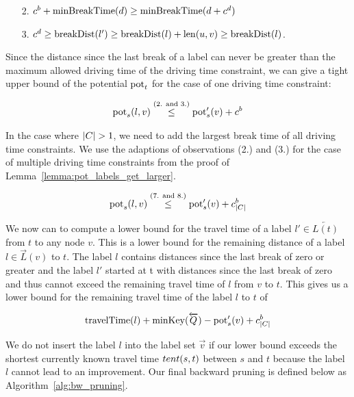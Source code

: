 \begin{enumerate}
	\item[2.] $c^b + \operatorname{minBreakTime}(d) \ge \operatorname{minBreakTime}(d + c^d)$
	\item[3.] $c^d \ge \operatorname{breakDist}(l') \ge \operatorname{breakDist}(l) + \operatorname{len}(u,v) \ge \operatorname{breakDist}(l)$.
\end{enumerate}

Since the distance since the last break of a label can never be greater than the maximum allowed driving time of the driving time constraint, we can give a tight upper bound of the potential $\operatorname{pot}_t$ for the case of one driving time constraint:

\begin{align}
	\operatorname{pot}_s(l,v) \overset{\text{(2. and 3.)}}{\le} \operatorname{pot}'_s(v) + c^b
\end{align}

In the case where $|C| > 1$, we need to add the largest break time of all driving time constraints. We use the adaptions of observations (2.) and (3.) for the case of multiple driving time constraints from the proof of Lemma~\ref{lemma:pot_labels_get_larger}.

\begin{align}
	\operatorname{pot}_s(l,v) \overset{\text{(7. and 8.)}}{\le} \operatorname{pot}'_s(v) + c_{|C|}^b
\end{align}

We now can to compute a lower bound for the travel time of a label $l' \in \overleftarrow{L(t)}$ from $t$ to any node $v$. This is a lower bound for the remaining distance of a label $l \in \overrightarrow{L}(v)$ to $t$. The label $l$ contains distances since the last break of zero or greater and the label $l'$ started at t with distances since the last break of zero and thus cannot exceed the remaining travel time of $l$ from $v$ to $t$. This gives us a lower bound for the remaining travel time of the label $l$ to $t$ of

\begin{align}
	\operatorname{travelTime}(l) + \operatorname{minKey}(\overleftarrow{Q}) - \operatorname{pot}'_s(v) + c_{|C|}^b
\end{align}

We do not insert the label $l$ into the label set $\overrightarrow{v}$ if our lower bound exceeds the shortest currently known travel time $tent(s,t)$ between $s$ and $t$ because the label $l$ cannot lead to an improvement. Our final backward pruning is defined below as Algorithm~\ref{alg:bw_pruning}.

